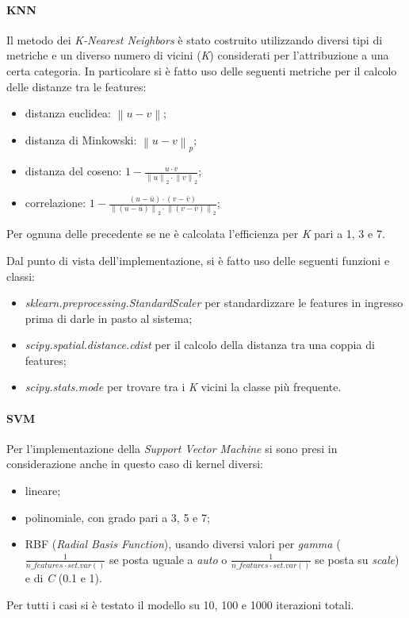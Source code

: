 \documentclass[11pt, a4paper, titlepage]{article}
\begin{document}
\paragraph{KNN}
Il metodo dei \emph{K-Nearest Neighbors} è stato costruito utilizzando diversi tipi di metriche e un diverso numero di vicini (\emph{K}) considerati per l'attribuzione a una certa categoria. In particolare si è fatto uso delle seguenti metriche per il calcolo delle distanze tra le features:
\begin{itemize}
    \item distanza euclidea: 
    \begin{math} \left \| u - v \right \| \end{math};
    \item distanza di Minkowski:
    \begin{math} \left \| u - v \right \|_p \end{math};
    \item distanza del coseno: 
    \begin{math} 1 - \frac{u \cdot v}{\left \| u \right \|_2 \cdot \left \| v \right \|_2} \end{math};
    \item correlazione: 
    \begin{math} 1 - \frac{(u - \bar u) \cdot (v - \bar v)}{\left \| (u - \bar u) \right \|_2 \cdot \left \| (v - \bar v) \right \|_2} \end{math};
\end{itemize}
Per ognuna delle precedente se ne è calcolata l'efficienza per \emph{K} pari a 1, 3 e 7.

\medskip
Dal punto di vista dell'implementazione, si è fatto uso delle seguenti funzioni e classi:
\begin{itemize}
    \item \emph{sklearn.preprocessing.StandardScaler} \cite{scikit-learn} per standardizzare le features in ingresso prima di darle in pasto al sistema;
    \item \emph{scipy.spatial.distance.cdist} \cite{scipy} per il calcolo della distanza tra una coppia di features;
    \item \emph{scipy.stats.mode} \cite{scipy} per trovare tra i \emph{K} vicini la classe più frequente.  
\end{itemize}

\paragraph{SVM}
Per l'implementazione della \emph{Support Vector Machine} si sono presi in considerazione anche in questo caso di kernel diversi:
\begin{itemize}
    \item lineare; 
    \item polinomiale, con grado pari a 3, 5 e 7;
    \item RBF (\emph{Radial Basis Function}), usando diversi valori per \emph{gamma} ($\frac{1}{n\_features \cdot set.var()}$ se posta uguale a \emph{auto} o $\frac{1}{n\_features \cdot set.var()}$ se posta su \emph{scale}) e di \emph{C} (0.1 e 1).
\end{itemize}
Per tutti i casi si è testato il modello su 10, 100 e 1000 iterazioni totali.
\end{document}

